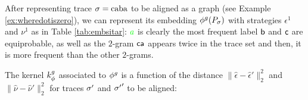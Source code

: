 \begin{example}
{After representing trace $\sigma=\textup{caba}$ to be aligned as a graph (see Example \ref{ex:wheredotiszero}), we can represent its}
embedding $\phi^{g}(P_{\sigma})$ with strategies $\epsilon^1$ and $\nu^1$ %
{as} in Table \ref{tab:embsitar}: ${\color{green}a}$ is clearly the most frequent label $\mathsf{b}$ and $\mathsf{c}$ are equiprobable, as well as the $2$-gram $\mathsf{ca}$ appears twice in the trace set and then, it is more frequent than the other $2$-grams.
\end{example}


The kernel $k_\phi^{g}$ associated to $\phi^{g}$ is
{ a function of the distance  $\|\hat{\epsilon}-\hat{\epsilon}'\|_2^2$ and $\|\hat{\nu}-\hat{\nu}'\|_2^2$ for traces ${\sigma'}$ and ${\sigma'}'$ to be aligned:}

